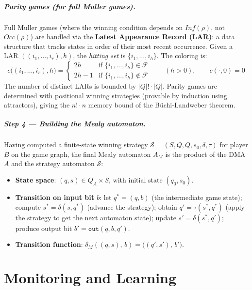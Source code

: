 \documentclass[oneside]{academica}
\begin{document}
\paragraph{Parity games (for full Muller games).}
Full Muller games (where the winning condition depends on $\mathit{Inf}(\rho)$, not $\mathit{Occ}(\rho)$) are handled via the \textbf{Latest Appearance Record (LAR)}: a data structure that tracks states in order of their most recent occurrence. Given a LAR $((i_1, \dots, i_r), h)$, the \emph{hitting set} is $\{i_1, \dots, i_h\}$. The coloring is:
\begin{equation*}
  c\big((i_1,\dots,i_r), h\big) = \begin{cases} 2h & \text{if } \{i_1,\dots,i_h\} \in \mathcal{F} \\ 2h-1 & \text{if } \{i_1,\dots,i_h\} \notin \mathcal{F} \end{cases} \qquad (h > 0), \qquad c(\cdot, 0) = 0
\end{equation*}
The number of distinct LARs is bounded by $|Q|! \cdot |Q|$. Parity games are determined with positional winning strategies (provable by induction using attractors), giving the $n! \cdot n$ memory bound of the Büchi-Landweber theorem.

\paragraph{Step 4 — Building the Mealy automaton.}
Having computed a finite-state winning strategy $\mathcal{S} = (S, Q, Q, s_0, \delta, \tau)$ for player $B$ on the game graph, the final Mealy automaton $A_M$ is the product of the DMA $A$ and the strategy automaton $\mathcal{S}$:
\begin{itemize}
  \item \textbf{State space}: $(q, s) \in Q_A \times S$, with initial state $(q_0, s_0)$.
  \item \textbf{Transition on input bit $b$}: let $q^* = (q, b)$ (the intermediate game state); compute $s^* = \delta(s, q^*)$ (advance the strategy); obtain $q' = \tau(s^*, q^*)$ (apply the strategy to get the next automaton state); update $s' = \delta(s^*, q')$; produce output bit $b' = \mathtt{out}(q, b, q')$.
  \item \textbf{Transition function}: $\delta_M\!\left((q,s),\, b\right) = \bigl((q', s'),\, b'\bigr)$.
\end{itemize}

\chapter{Monitoring and Learning}
\end{document}
